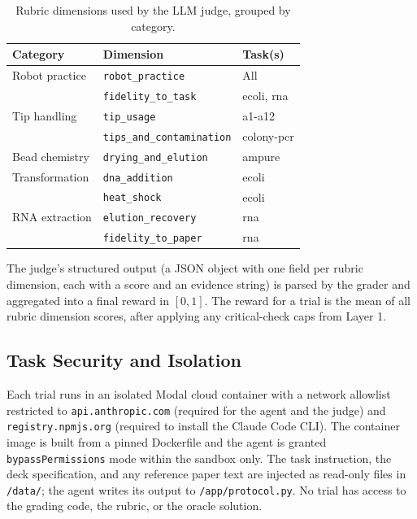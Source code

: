 \documentclass[11pt,a4paper]{article}
\begin{document}
\begin{table}[H]
\centering
\caption{Rubric dimensions used by the LLM judge, grouped by category.}
\label{tab:rubrics}
\footnotesize
\begin{tabular}{lll}
\toprule
\textbf{Category} & \textbf{Dimension} & \textbf{Task(s)} \\
\midrule
Robot practice & \texttt{robot\_practice} & All \\
               & \texttt{fidelity\_to\_task} & ecoli, rna \\
Tip handling   & \texttt{tip\_usage} & a1-a12 \\
               & \texttt{tips\_and\_contamination} & colony-pcr \\
Bead chemistry & \texttt{drying\_and\_elution} & ampure \\
Transformation & \texttt{dna\_addition} & ecoli \\
               & \texttt{heat\_shock} & ecoli \\
RNA extraction & \texttt{elution\_recovery} & rna \\
               & \texttt{fidelity\_to\_paper} & rna \\
\bottomrule
\end{tabular}
\end{table}

The judge's structured output (a JSON object with one field per rubric
dimension, each with a score and an evidence string) is parsed by the
grader and aggregated into a final reward in $[0, 1]$.
The reward for a trial is the mean of all rubric dimension scores, after
applying any critical-check caps from Layer 1.

\subsection{Task Security and Isolation}

Each trial runs in an isolated Modal cloud container with a network
allowlist restricted to \texttt{api.anthropic.com} (required for the
agent and the judge) and \texttt{registry.npmjs.org} (required to install
the Claude Code CLI).
The container image is built from a pinned Dockerfile and the agent is
granted \texttt{bypassPermissions} mode within the sandbox only.
The task instruction, the deck specification, and any reference paper text
are injected as read-only files in \texttt{/data/}; the agent writes its
output to \texttt{/app/protocol.py}.
No trial has access to the grading code, the rubric, or the oracle solution.
\end{document}
